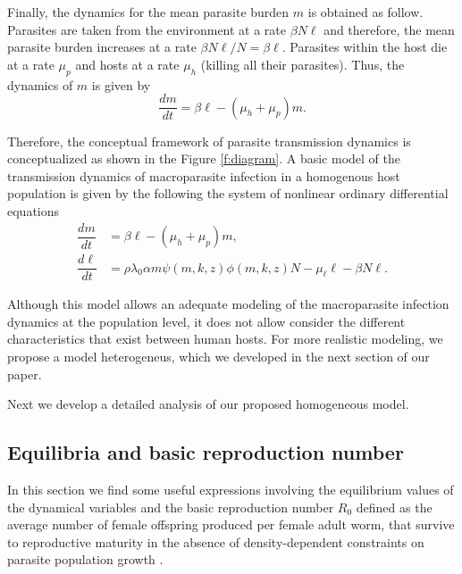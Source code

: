 \documentclass[eng]{MMSB-class-eng}
\begin{document}
Finally, the dynamics for the mean parasite burden $m$ is obtained as follow. Parasites are taken from the environment at a rate $\beta N \ell $ and therefore, the mean parasite burden increases at a rate $\beta  N\ell/N=\beta\ell $. Parasites within the host die at a rate $\mu_p$ and hosts at a rate $\mu_h$ (killing all their parasites). Thus, the dynamics of $m$ is given by
\begin{equation}\label{eqm}
\dfrac{dm}{dt}=\beta \ell - (\mu_h+\mu_p)m.
\end{equation}
{\color{red}
Therefore, the conceptual framework of parasite transmission dynamics is conceptualized as shown in the Figure \ref{f:diagram}. A basic model of the transmission dynamics of macroparasite infection in a homogenous host population is given by the following the system of nonlinear ordinary differential equations 
\begin{equation}\label{model1}
\begin{split}
\dfrac{dm}{dt}&=\beta \ell - (\mu_h+\mu_p)m,\\
\dfrac{d\ell}{dt}&= \rho\lambda_0
\alpha m
\psi(m,k,z) \phi(m,k,z) N- \mu_{\ell} \ell -\beta N \ell.
\end{split}
\end{equation}

Although this model allows an adequate modeling of the macroparasite infection dynamics at the population level, it does not allow consider the different characteristics that exist between human hosts.
For more realistic modeling, we propose a model heterogeneus, which we developed in the next section of our paper.

Next we develop a detailed analysis of our proposed homogeneous model.


\subsection{Equilibria and basic reproduction number}

{\color{red}
In this section we find some useful expressions involving the equilibrium values of the dynamical variables and the basic reproduction number $R_0$ defined as 
the average number of female offspring produced per female adult worm, that survive to reproductive maturity in the
absence of density-dependent constraints on parasite population growth \citep{anderson1992infectious}.



}}
\end{document}
